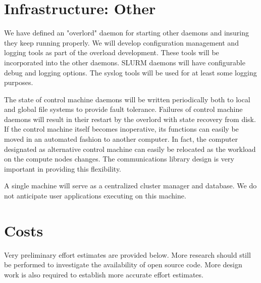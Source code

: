 \section{Infrastructure: Other}

We have defined an "overlord" daemon for starting other daemons and insuring
they keep running properly. We will develop configuration management and
logging tools as part of the overload development. These tools will be
incorporated into the other daemons. SLURM daemons will have configurable debug
and logging options. The syslog tools will be used for at least some logging
purposes.

The state of control machine daemons will be written periodically both to local
and global file systems to provide fault tolerance. Failures of control machine
daemons will result in their restart by the overlord with state recovery from
disk. If the control machine itself becomes inoperative, its functions can
easily be moved in an automated fashion to another computer. In fact, the
computer designated as alternative control machine can easily be relocated as
the workload on the compute nodes changes. The communications library design is
very important in providing this flexibility.

A single machine will serve as a centralized cluster manager and database. We
do not anticipate user applications executing on this machine. 

\section{Costs}

Very preliminary effort estimates are provided below. More research should
still be performed to investigate the availability of open source code. More
design work is also required to establish more accurate effort estimates.

